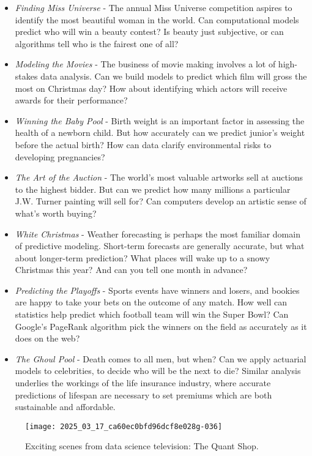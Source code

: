 \documentclass[10pt]{article}
\begin{document}
\begin{itemize}
  \item \emph{Finding Miss Universe} - The annual Miss Universe competition aspires to identify the most beautiful woman in the world. Can computational models predict who will win a beauty contest? Is beauty just subjective, or can algorithms tell who is the fairest one of all?
  \item \emph{Modeling the Movies} - The business of movie making involves a lot of high-stakes data analysis. Can we build models to predict which film will gross the most on Christmas day? How about identifying which actors will receive awards for their performance?
  \item \emph{Winning the Baby Pool} - Birth weight is an important factor in assessing the health of a newborn child. But how accurately can we predict junior's weight before the actual birth? How can data clarify environmental risks to developing pregnancies?
  \item \emph{The Art of the Auction} - The world's most valuable artworks sell at auctions to the highest bidder. But can we predict how many millions a particular J.W. Turner painting will sell for? Can computers develop an artistic sense of what's worth buying?
  \item \emph{White Christmas} - Weather forecasting is perhaps the most familiar domain of predictive modeling. Short-term forecasts are generally accurate, but what about longer-term prediction? What places will wake up to a snowy Christmas this year? And can you tell one month in advance?
  \item \emph{Predicting the Playoffs} - Sports events have winners and losers, and bookies are happy to take your bets on the outcome of any match. How well can statistics help predict which football team will win the Super Bowl? Can Google's PageRank algorithm pick the winners on the field as accurately as it does on the web?
  \item \emph{The Ghoul Pool} - Death comes to all men, but when? Can we apply actuarial models to celebrities, to decide who will be the next to die? Similar analysis underlies the workings of the life insurance industry, where accurate predictions of lifespan are necessary to set premiums which are both sustainable and affordable.
\end{itemize}

\begin{figure}[h!]
\centering
\texttt{[image: 2025\_03\_17\_ca60ec0bfd96dcf8e028g-036]}
\caption{Exciting scenes from data science television: The Quant Shop.}
\label{fig:1.8}
\end{figure}
\end{document}

